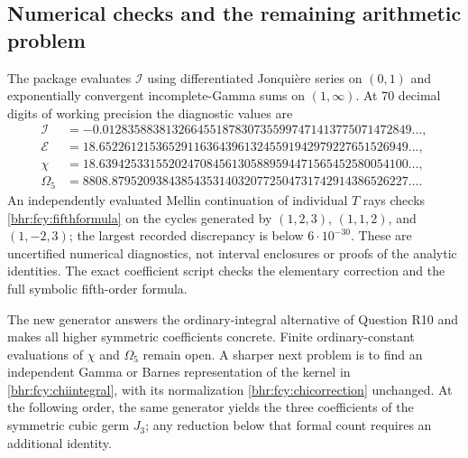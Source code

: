 \subsection{Numerical checks and the remaining arithmetic problem}
The package evaluates \(\mathcal I\) using differentiated
Jonqui\`ere series on \((0,1)\) and exponentially convergent
incomplete-Gamma sums on \((1,\infty)\). At 70 decimal digits
of working precision the diagnostic values are
\begin{align*}
 \mathcal I&=-0.0128358838132664551878307355997471413775071472849\ldots,\\
 \mathcal E&=18.6522612153652911636439613245591942979227651526949\ldots,\\
 \chi&=18.6394253315520247084561305889594471565452580054100\ldots,\\
 \Omega_5&=8808.87952093843854353140320772504731742914386526227\ldots.
\end{align*}
An independently evaluated Mellin continuation of individual
\(T\) rays checks \eqref{bhr:fcy:fifthformula} on the cycles generated
by \((1,2,3)\), \((1,1,2)\), and \((1,-2,3)\); the largest
recorded discrepancy is below \(6\cdot10^{-30}\). These are
uncertified numerical diagnostics, not interval enclosures or
proofs of the analytic identities. The exact coefficient script
checks the elementary correction and the full symbolic fifth-order
formula.

The new generator answers the ordinary-integral alternative of
Question R10 and makes all higher symmetric coefficients concrete.
Finite ordinary-constant evaluations of \(\chi\) and
\(\Omega_5\) remain open. A sharper next problem is to find an
independent Gamma or Barnes representation of the kernel in
\eqref{bhr:fcy:chiintegral}, with its normalization \eqref{bhr:fcy:chicorrection}
unchanged. At the following order, the same generator yields the
three coefficients of the symmetric cubic germ \(J_3\); any
reduction below that formal count requires an additional identity.
